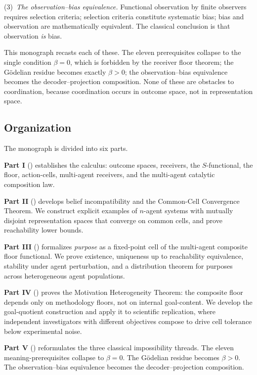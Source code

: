\documentclass[11pt,a4paper]{article}
\begin{document}
(3)~\emph{The observation--bias equivalence.} Functional observation by
finite observers requires selection criteria; selection criteria
constitute systematic bias; bias and observation are mathematically
equivalent. The classical conclusion is that observation \emph{is}
bias.

This monograph recasts each of these. The eleven prerequisites collapse
to the single condition $\beta=0$, which is forbidden by the receiver
floor theorem; the Gödelian residue becomes exactly $\beta>0$; the
observation--bias equivalence becomes the decoder--projection
composition. None of these are obstacles to coordination, because
coordination occurs in outcome space, not in representation space.

\subsection{Organization}

The monograph is divided into six parts.

\textbf{Part I} ()
establishes the calculus: outcome spaces, receivers, the $S$-functional,
the floor, action-cells, multi-agent receivers, and the multi-agent
catalytic composition law.

\textbf{Part II} ()
develops belief incompatibility and the Common-Cell Convergence Theorem.
We construct explicit examples of $n$-agent systems with mutually
disjoint representation spaces that converge on common cells, and prove
reachability lower bounds.

\textbf{Part III} ()
formalizes \emph{purpose} as a fixed-point cell of the multi-agent
composite floor functional. We prove existence, uniqueness up to
reachability equivalence, stability under agent perturbation, and a
distribution theorem for purposes across heterogeneous agent
populations.

\textbf{Part IV} ()
proves the Motivation Heterogeneity Theorem: the composite floor depends
only on methodology floors, not on internal goal-content. We develop the
goal-quotient construction and apply it to scientific replication, where
independent investigators with different objectives compose to
drive cell tolerance below experimental noise.

\textbf{Part V}
()
reformulates the three classical impossibility threads. The eleven
meaning-prerequisites collapse to $\beta=0$. The Gödelian residue
becomes $\beta>0$. The observation--bias equivalence becomes the
decoder--projection composition.
\end{document}
